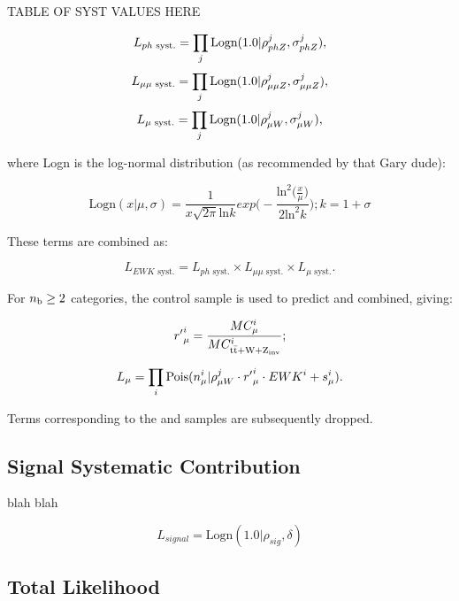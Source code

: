 TABLE OF SYST VALUES HERE

\begin{equation}
L_{ph\text{ syst.}} = \prod_j \text{Logn}(1.0 | \rho^j_{phZ}, \sigma^j_{phZ}),
\end{equation}
\begin{equation}
L_{\mu\mu\text{ syst.}} = \prod_j \text{Logn}(1.0 | \rho^j_{\mu\mu Z}, \sigma^j_{\mu\mu Z}),
\end{equation}
\begin{equation}
L_{\mu\text{ syst.}} = \prod_j \text{Logn}(1.0 | \rho^j_{\mu W}, \sigma^j_{\mu W}),
\end{equation}

where Logn is the log-normal distribution (as recommended by that Gary dude):

\begin{equation}
\text{Logn}(x|\mu, \sigma) = \frac{1}{x\sqrt{2\pi}\text{ln}k} exp \Bigg(-\frac{\text{ln}^2 \big(\frac{x}{\mu}\big)}{2\text{ln}^2k}\Bigg); k = 1+\sigma
\end{equation}

These terms are combined as:

\begin{equation}
L_{EWK\text{ syst.}} = L_{ph\text{ syst.}} \times L_{\mu\mu\text{ syst.}} \times L_{\mu\text{ syst.}}.
\end{equation}

For $n_{\text{b}} \geq 2$ categories, the \mj control sample is used to predict \zinv and
\ttw combined, giving:

\begin{equation}
{r'}^i_{\mu} = \frac{MC_{\mu}^i}{MC^i_{\rm{t}\bar{\rm{t}} + W + Z_{\text{inv}}}};
\end{equation}

\begin{equation}
L_{\mu} = \prod_i \text{Pois}(n_{\mu}^i | \rho^j_{\mu W} \cdot {r'}_{\mu}^i \cdot {EWK}^i + s_{\mu}^i).
\end{equation}

Terms corresponding to the \mmj and \gj samples are subsequently dropped.

\subsection{Signal Systematic Contribution}
blah blah

\begin{equation}
L_{signal} = \text{Logn}(1.0 | \rho_{sig}, \delta)
\end{equation}

\subsection{Total Likelihood}

